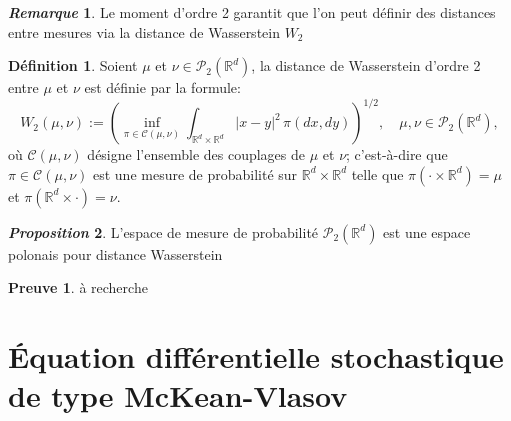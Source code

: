 \documentclass[12pt,a4paper,twoside]{book}%
\theoremstyle{definition}
\newtheorem{dfn}{Définition}[section]
\newtheorem*{pr}{\textbf{Preuve}}
\newtheorem{rem}{\textit{Remarque}}[section]
\newtheorem{prop}[dfn]{\textit{Proposition}}
\numberwithin{equation}{section}
\begin{document}
	\begin{rem}
		Le moment d'ordre 2 garantit que l'on peut définir des distances entre mesures via la distance de Wasserstein $W_2$
	\end{rem}
	\begin{dfn}
		Soient $\mu$ et $\nu\in\mathcal{P}_2(\mathbb{R}^d)$, la distance de Wasserstein d'ordre 2 entre $\mu$ et $\nu$ est définie par la formule:
		\[
		W_2(\mu, \nu) := \left( \inf_{\pi \in \mathcal{C}(\mu, \nu)} \int_{\mathbb{R}^d \times \mathbb{R}^d} |x - y|^2 \, \pi(dx, dy) \right)^{1/2}, 
		\quad \mu, \nu \in \mathcal{P}_2(\mathbb{R}^d),
		\]
		où $\mathcal{C}(\mu,\nu)$ désigne l'ensemble des couplages de $\mu$ et $\nu$; c'est-à-dire que $\pi\in\mathcal{C}(\mu,\nu)$ est une mesure de probabilité sur $\mathbb{R}^d\times\mathbb{R}^d$ telle que $\pi(\cdot\times\mathbb{R}^d) = \mu$ et $\pi(\mathbb{R}^d\times\cdot)=\nu$.
	\end{dfn}
	\begin{prop}
		L'espace de mesure de probabilité $\mathcal{P}_2(\mathbb{R}^d)$ est une espace polonais pour distance Wasserstein
	\end{prop}
	\begin{pr}
		à recherche
	\end{pr}
	

\section{Équation différentielle stochastique de type McKean-Vlasov}
\end{document}
